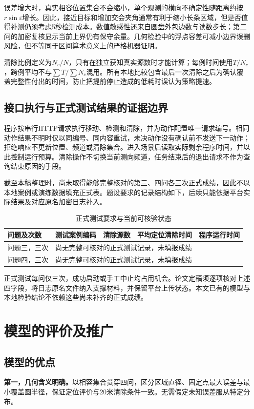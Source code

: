\documentclass{JXUSTmodeling}
\begin{document}
误差增大时，真实相容位置集合不会缩小，单个观测的横向不确定性随距离约按$r\sin\varepsilon$增长。因此，接近目标和增加交会夹角通常有利于缩小长条区域，但是否值得补测仍须考虑5秒检测成本。数值敏感性还来自圆盘外包边数与读数步长；第二问的加密复核显示当前上界仍有保守余量。几何检验中的浮点容差可减小边界误删风险，但不等同于区间算术意义上的严格机器证明。

清除比例定义为$N_c/N$，只有在独立获知真实源数时才能计算；每例时间使用$T/N_c$，跨例平均不与$\sum T/\sum N_c$混用。所有本地比较包含最后一次清除之后为确认覆盖完整性付出的时间，防止把提前停止造成的低耗时误认为策略提速。

\subsection{接口执行与正式测试结果的证据边界}
程序按串行HTTP请求执行移动、检测和清除，并为动作配置唯一请求编号。相同动作结果不明时仅以同编号、同内容重试，未决动作没有确认前不发送下一动作；拒绝响应不更新位置、频道或清除集合。进入场景后读取实际剩余程序时间，并以此控制运行预算。清除操作不切换当前测向频道，任务结束后的退出请求不作为查询结束原因的手段。

截至本稿整理时，尚未取得能够完整核对的第三、四问各三次正式成绩，因此不以本地案例或演练数据填充正式表。题设要求的记录结构如下，后续只能依据平台实际结果及对应原名加密日志补入。
\begin{table}[htbp]
\centering\small
\caption{正式测试要求与当前可核验状态}
\begin{tabularx}{\textwidth}{lXXXX}
\toprule
问题及次数 & 测试案例编码 & 清除源数 & 平均定位清除时间 & 程序运行时间\\
\midrule
问题三，三次 & \multicolumn{4}{l}{尚无完整可核对的正式测试记录，未填报成绩}\\
问题四，三次 & \multicolumn{4}{l}{尚无完整可核对的正式测试记录，未填报成绩}\\
\bottomrule
\end{tabularx}
\end{table}
正式测试每问仅三次，成功启动或手工中止均占用机会。论文定稿须逐项核对上述四字段，将日志原名文件纳入支撑材料，并保留平台上传状态。本文已有的模型与本地检验结论不依赖这些尚未补齐的正式成绩。

\section{模型的评价及推广}\label{sec:7}
\subsection{模型的优点}
\textbf{第一，几何含义明确。}以相容集合贯穿四问，区分区域直径、固定点最大误差与最小覆盖圆半径，保证定位评价与20米清除条件一致。无需假定未知误差服从特定分布。
\end{document}
